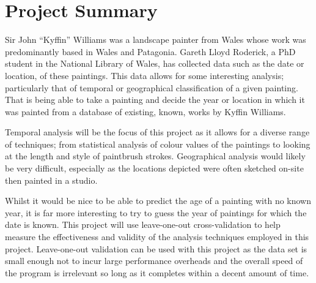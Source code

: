\documentclass[11pt,fleqn,twoside]{article}
\begin{document}

\mmp

\setcounter{tocdepth}{3} %
\tableofcontents
\listoffigures
\listoftables

\newpage

\clearpage
\section{Project Summary}
Sir John ``Kyffin'' Williams was a landscape painter from Wales whose work was predominantly based 
in Wales and Patagonia. Gareth Lloyd Roderick, a PhD student in the National Library of Wales, has
collected data such as the date or location, of these paintings. This data allows for some 
interesting analysis; particularly that of temporal or geographical classification of a given 
painting. That is being able to take a painting and decide the year or location in which it was
painted from a database of existing, known, works by Kyffin Williams.

Temporal analysis will be the focus of this project as it allows for a diverse range of techniques;
from statistical analysis of colour values of the paintings to looking at the length and style of 
paintbrush strokes. Geographical analysis would likely be very difficult, especially as the locations
depicted were often sketched on-site then painted in a studio.

Whilst it would be nice to be able to predict the age of a painting with no known year, it is far
more interesting to try to guess the year of paintings for which the date is known. This project 
will use leave-one-out cross-validation to help measure the effectiveness and validity of the 
analysis techniques employed in this project. Leave-one-out validation can be used with this 
project as the data set is small enough not to incur large performance overheads and the overall
speed of the program is irrelevant so long as it completes within a decent amount of time.
\end{document}
